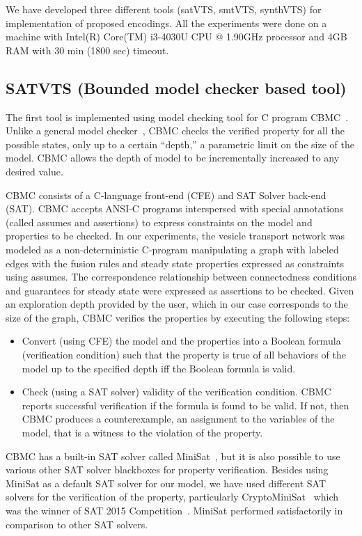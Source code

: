 We have developed three different tools (satVTS, smtVTS, synthVTS) for implementation of proposed encodings. All the experiments were done on a machine with Intel(R) Core(TM) i3-4030U CPU @ 1.90GHz processor and 4GB RAM with 30 min (1800 sec) timeout.
\subsection{SATVTS (Bounded model checker based tool)} 
The first tool is implemented using model checking tool for C program CBMC~\cite{clarke2004tool}.
%
Unlike a general model checker~\cite{cimatti2002nusmv}, CBMC checks the verified property for all the possible states, only up to a certain “depth,” a parametric limit on the size of the model.
%
CBMC allows the depth of model to be incrementally increased to any desired value.

CBMC consists of a C-language front-end (CFE) and SAT Solver back-end (SAT).
%
CBMC accepts ANSI-C programs interspersed with special annotations (called assumes and assertions) to express constraints on the model and properties to be checked. 
%		
In our experiments, the vesicle transport network was modeled as a non-deterministic C-program manipulating a graph with labeled edges with the fusion rules and steady state properties expressed as constraints
using assumes. 
%		
The correspondence relationship between connectedness conditions
and guarantees for steady state were expressed as assertions to be checked. 
%		
Given an exploration depth provided by the user, which in our case corresponds to the size of the graph, CBMC verifies the properties by executing the following steps:
	\begin{itemize}
	\item Convert (using CFE) the model and the properties into a Boolean formula (verification condition) such that the property is true of all behaviors of the model up to the specified
depth iff the Boolean formula is valid.
	\item Check (using a SAT solver) validity of the verification condition. CBMC reports successful verification if the formula is found to be valid. If not, then CBMC produces a counterexample,
an assignment to the variables of the model, that is a witness to the violation of the property.
	\end{itemize}

CBMC has a built-in SAT solver called MiniSat~\cite{sorensson2005minisat}, but it is also possible to use various other SAT solver blackboxes for property verification. Besides using MiniSat as a default SAT solver for our model, we have used different SAT solvers for the verification of the property, particularly CryptoMiniSat~\cite{soos2016cryptominisat} which was the winner of SAT 2015 Competition~\cite{balyo2016sat}. 
%		
MiniSat performed satisfactorily in comparison to other SAT solvers.

